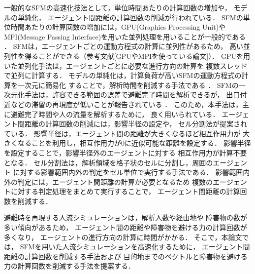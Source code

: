 一般的なSFMの高速化技法として，単位時間あたりの計算回数の増加や，
モデルの単純化，
エージェント間距離の計算回数の削減が行われている．
SFMの単位時間あたりの計算回数の増加には，GPU(Graphics Processing Unit)や
MPI(Message Passing Interface)を用いた並列処理を用いることが一般的である
\cite{seru_sfm1}\cite{seru_sfm2}
\cite{sfm_gpu1}\cite{sfm_gpu2}\cite{sfm_gpu3}\cite{sfm_gpu4}．
\cite{mpi1}\cite{mpi2}
SFMは，エージェントごとの運動方程式の計算に並列性があるため，
高い並列性を得ることができる（参考文献[GPUやMPIを使っている論文]）．
GPUを用いた並列化手法は，エージェントごとに必要な進行方向の計算を
複数スレッドで並列に計算する．
モデルの単純化は，計算負荷が高いSFMの運動方程式の計算を一次元に簡易化
することで，解析時間を削減する手法である
\cite{1jigen_model}\cite{1jigen_model1}\cite{1jigen_model2}．
SFMの一次元化手法は，許容できる範囲の誤差で避難完了時間を解析できるが，
出口付近などの滞留の再現度が低いことが報告されている
\cite{1jigen_model2}．
このため，本手法は，主に避難完了時間や人の流量を解析するために，
良く用いられている\cite{1jigen_katuyou}\cite{1jigen_model_ev1}\cite{1jigen_model_ev2}．
エージェント間距離の計算回数の削減には，影響半径の設定や，
セル分割法が提案されている\cite{cell1}\cite{cell2}．
影響半径は，エージェント間の距離が大きくなるほど相互作用力が
大きくなることを利用し，相互作用力が0に近似可能な距離を設定する．
影響半径を設定することで，影響半径外のエージェントに対する
相互作用力が計算不要となる\cite{eikyo_space}．
セル分割法は，解析領域を格子状のセルに分割し，周囲のエージェント
に対する影響範囲内外の判定をセル単位で実行する手法である．
影響範囲内外の判定には，エージェント間距離の計算が必要となるため
複数のエージェントに対する判定処理をまとめて実行することで，
エージェント間距離の計算回数を削減する．

避難時を再現する人流シミュレーションは，解析人数や経由地や
障害物の数が多い傾向があるため，
エージェント間の距離や障害物を避ける力の計算回数が多くなり，
エージェントの進行方向の計算に時間がかかる．
そこで，本論文では，
SFMを用いた人流シミュレーションを高速化するために，
エージェント間距離の計算回数を削減する手法および
目的地までのベクトルと障害物を避ける力の計算回数を削減する手法を提案する．


